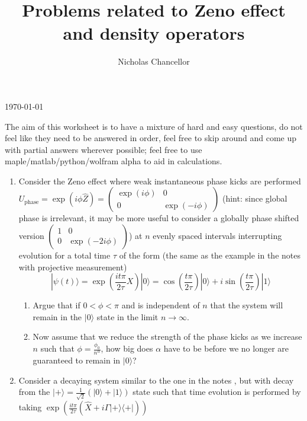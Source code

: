 \documentclass[english]{article}
\newcommand{\ket}[1]{|#1 \rangle}
\newcommand{\ketbra}[2]{\vert #1 \rangle \! \langle #2 \vert}
\begin{document}
\title{Problems related to Zeno effect and density operators}
\author{Nicholas Chancellor}


\maketitle


\today %


{\small The aim of this worksheet is to have a mixture of hard and easy questions, do not feel like they need to be answered in order, feel free to skip around and come up with partial answers wherever possible; feel free to use maple/matlab/python/wolfram alpha to aid in calculations.}

\begin{enumerate}
\item Consider the Zeno effect where weak instantaneous phase kicks are performed $U_{\mathrm{phase}}=\exp(i \phi \hat{Z})=\left( \begin{array}{cc} \exp(i \phi) & 0 \\ 0 & \exp(-i \phi) \end{array} \right)$ (hint: since global phase is irrelevant, it may be more useful to consider a globally phase shifted version $\left( \begin{array}{cc} 1 & 0 \\ 0 & \exp(-2 i \phi) \end{array} \right)$) at $n$ evenly spaced intervals interrupting evolution for a total time $\tau$ of the form (the same as the example in the notes with projective measurement)
\begin{equation}
\ket{\psi(t)}=\exp\left(\frac{i t \pi }{2 \tau} X\right)\ket{0}=\cos(\frac{ t \pi }{2 \tau})\ket{0}+i \sin(\frac{ t \pi }{2 \tau})\ket{1}
\end{equation}
\begin{enumerate}
\item Argue that if $0<\phi<\pi$ and is independent of $n$ that the system will remain in the $\ket{0}$ state in the limit $n \rightarrow \infty$.
\item Now assume that we reduce the strength of the phase kicks as we increase $n$ such that $\phi=\frac{\phi_0}{n^\alpha}$, how big does $\alpha$ have to be before we no longer are guaranteed to remain in $\ket{0}$?
\end{enumerate}
\item Consider a decaying system similar to the one in the notes , but with decay from the $\ket{+}=\frac{1}{\sqrt{2}}(\ket{0}+\ket{1})$ state such that time evolution is performed by taking $\exp\left(\frac{i t \pi }{2 \tau} (\hat{X}+i\Gamma\ketbra{+}{+})\right)$

\end{enumerate}
\end{document}

